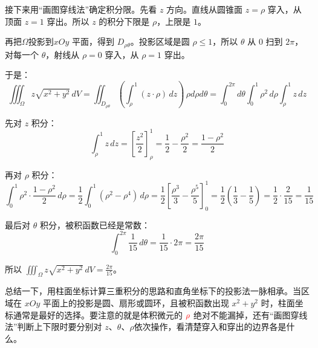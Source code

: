 \begin{myexample}
\begin{center}
\end{center}

    接下来用“画图穿线法”确定积分限。先看 \(z\) 方向。直线从圆锥面 \(z=\rho\) 穿入，从顶面 \(z=1\) 穿出。所以 \(z\) 的积分下限是 \(\rho\)，上限是 \(1\)。
    
    再把\(\Omega\)投影到\(xOy\) 平面，得到 \(D_{\rho\theta}\)。投影区域是圆 \(\rho\le 1\)，所以 \(\theta\) 从 \(0\) 扫到 \(2\pi\)，对每一个 \(\theta\)，射线从 \(\rho=0\) 穿入，从 \(\rho=1\) 穿出。

    于是：
    \[
    \iiint_{\Omega} z\sqrt{x^2+y^2}\,dV
    =\iint_{D_{\rho\theta}} \left(\int_{\rho}^{1} (z\cdot \rho) \, dz\right) \, \rho d\rho d\theta
    = \int_{0}^{2\pi} d\theta \int_{0}^{1} \rho^2\,d\rho \int_{\rho}^{1} z \, dz
    \]

    先对 \(z\) 积分：
    \[
    \int_{\rho}^{1} z\,dz = \left[ \frac{z^2}{2} \right]_{\rho}^{1} = \frac{1}{2} - \frac{\rho^2}{2} = \frac{1-\rho^2}{2}
    \]

    再对 \(\rho\) 积分：
    \[
    \int_{0}^{1} \rho^2 \cdot \frac{1-\rho^2}{2} \, d\rho
    = \frac{1}{2} \int_{0}^{1} (\rho^2 - \rho^4) \, d\rho
    = \frac{1}{2} \left[ \frac{\rho^3}{3} - \frac{\rho^5}{5} \right]_{0}^{1}
    = \frac{1}{2} \left( \frac{1}{3} - \frac{1}{5} \right)
    = \frac{1}{2} \cdot \frac{2}{15} = \frac{1}{15}
    \]

    最后对 \(\theta\) 积分，被积函数已经是常数：
    \[
    \int_{0}^{2\pi} \frac{1}{15}\,d\theta = \frac{1}{15} \cdot 2\pi = \frac{2\pi}{15}
    \]

    所以 \(\iiint_{\Omega} z\sqrt{x^2+y^2}\,dV = \frac{2\pi}{15}\)。
\end{myexample}

总结一下，用柱面坐标计算三重积分的思路和直角坐标下的投影法一脉相承。当区域在 \(xOy\) 平面上的投影是圆、扇形或圆环，且被积函数出现 \(x^2+y^2\) 时，柱面坐标通常是最好的选择。要注意的就是体积微元的 \(\textcolor{red}{\rho}\) 绝对不能漏掉，还有“画图穿线法”判断上下限时要分别对 \(z\)、\(\theta\)、\(\rho\)依次操作，看清楚穿入和穿出的边界各是什么。

